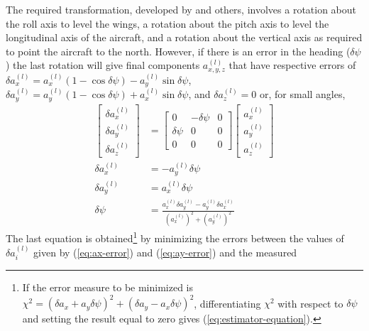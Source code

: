 \documentclass[12pt,twoside,english,12pt,twoside,english]{article}\usepackage[]{graphicx}\usepackage[]{color}
\let\OrgIndex\index
\renewcommand*{\index}[1]{\OrgIndex{#1}}
\begin{document}
The required transformation,
developed by \citet{Bulletin23} and others, involves
a rotation about the roll axis to level the wings, a rotation about
the pitch axis to level the longitudinal axis of the aircraft, and
a rotation about the vertical axis as required to point the aircraft
to the north. However, if there is an error
in the heading ($\delta\psi$) the last rotation will give final components
$a_{x,y,z}^{(l)}$ that have respective errors of $\delta a_{x}^{(l)}=a_{x}^{(l)}(1-\cos\delta\psi)-a_{y}^{(l)}\sin\delta\psi$,
$\delta a_{y}^{(l)}=a_{y}^{(l)}(1-\cos\delta\psi)+a_{x}^{(l)}\sin\delta\psi$,
and $\delta a_{z}^{(l)}=0$ or, for small angles,\\
\begin{align}
\left[\begin{array}{c}
\delta a_{x}^{(l)}\\
\delta a_{y}^{(l)}\\
\delta a_{z}^{(l)}
\end{array}\right] & =\left[\begin{array}{ccc}
0 & -\delta\psi & 0\\
\delta\psi & 0 & 0\\
0 & 0 & 0
\end{array}\right]\left[\begin{array}{c}
a_{x}^{(l)}\\
a_{y}^{(l)}\\
a_{z}^{(l)}
\end{array}\right]\label{eq:heading-error-equation}\\
\delta a_{x}^{(l)} & =-a_{y}^{(l)}\delta\psi\label{eq:ax-error}\\
\delta a_{y}^{(l)} & =a_{x}^{(l)}\delta\psi\label{eq:ay-error}\\
\delta\psi & =\frac{a_{x}^{(l)}\delta a_{y}^{(l)}-a_{y}^{(l)}\delta a_{x}^{(l)}}{(a_{x}^{(l)})^{2}+(a_{y}^{(l)})^{2}}\label{eq:estimator-equation}
\end{align}
The last equation is obtained\footnote{If the error measure to be minimized is $\chi^{2}=(\delta a_{x}+a_{y}\delta\psi)^{2}+(\delta a_{y}-a_{x}\delta\psi)^{2}$,
differentiating $\chi^{2}$ with respect to $\delta\psi$ and setting
the result equal to zero gives (\ref{eq:estimator-equation}).} by minimizing the errors between the values of $\delta a_{i}^{(l)}$
given by (\ref{eq:ax-error}) and (\ref{eq:ay-error}) and the measured
\end{document}
